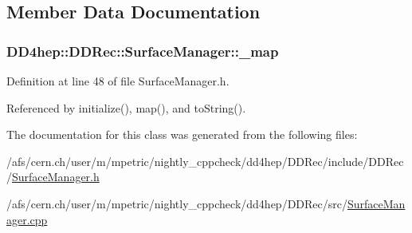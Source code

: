 \subsection{Member Data Documentation}
\hypertarget{class_d_d4hep_1_1_d_d_rec_1_1_surface_manager_a372c8c43ba149a5bf7d14da8ef63223d}{
\subsubsection[{\_\-map}]{ {\bf DD4hep::DDRec::SurfaceManager::\_\-map}}}
\label{class_d_d4hep_1_1_d_d_rec_1_1_surface_manager_a372c8c43ba149a5bf7d14da8ef63223d}


Definition at line 48 of file SurfaceManager.h.

Referenced by initialize(), map(), and toString().

The documentation for this class was generated from the following files:\begin{DoxyCompactItemize}
\item 
/afs/cern.ch/user/m/mpetric/nightly\_\-cppcheck/dd4hep/DDRec/include/DDRec/\hyperlink{_surface_manager_8h}{SurfaceManager.h}\item 
/afs/cern.ch/user/m/mpetric/nightly\_\-cppcheck/dd4hep/DDRec/src/\hyperlink{_surface_manager_8cpp}{SurfaceManager.cpp}\end{DoxyCompactItemize}
